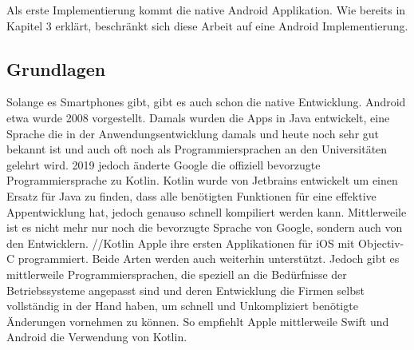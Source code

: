 Als erste Implementierung kommt die native Android Applikation. Wie bereits in Kapitel 3 erklärt, beschränkt sich diese Arbeit auf eine Android Implementierung.

\subsection{Grundlagen}
Solange es Smartphones gibt, gibt es auch schon die native Entwicklung. Android etwa wurde 2008 vorgestellt. Damals wurden die Apps in Java entwickelt, eine Sprache die in der Anwendungsentwicklung damals und heute noch sehr gut bekannt ist und auch oft noch als Programmiersprachen an den Universitäten gelehrt wird. 2019 jedoch änderte Google die offiziell bevorzugte Programmiersprache zu Kotlin. Kotlin wurde von Jetbrains entwickelt um einen Ersatz für Java zu finden, dass alle benötigten Funktionen für eine effektive Appentwicklung hat, jedoch genauso schnell kompiliert werden kann. Mittlerweile ist es nicht mehr nur noch die bevorzugte Sprache von Google, sondern auch von den Entwicklern. //Kotlin Apple ihre ersten Applikationen für iOS mit Objectiv-C programmiert. Beide Arten werden auch weiterhin unterstützt. Jedoch gibt es mittlerweile Programmiersprachen, die speziell an die Bedürfnisse der Betriebssysteme angepasst sind und deren Entwicklung die Firmen selbst vollständig in der Hand haben, um schnell und Unkompliziert benötigte Änderungen vornehmen zu können. So empfiehlt Apple mittlerweile Swift und Android die Verwendung von Kotlin.

